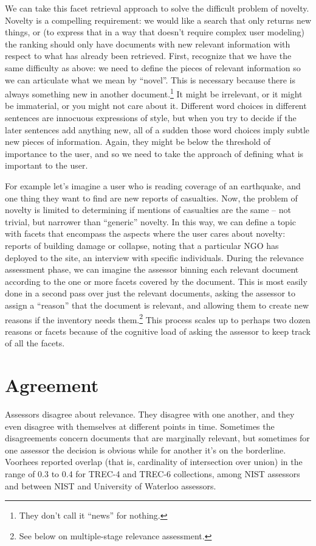 \documentclass[nobib]{tufte-book}
\begin{document}
We can take this facet retrieval approach to solve the difficult problem of novelty.  Novelty is a compelling requirement: we would like a search that only returns new things, or (to express that in a way that doesn't require complex user modeling) the ranking should only have documents with new relevant information with respect to what has already been retrieved.  First, recognize that we have the same difficulty as above: we need to define the pieces of relevant information so we can articulate what we mean by ``novel''.  This is necessary because there is always something new in another document.\footnote{They don't call it ``news'' for nothing.}  It might be irrelevant, or it might be immaterial, or you might not care about it.  Different word choices in different sentences are innocuous expressions of style, but when you try to decide if the later sentences add anything new, all of a sudden those word choices imply subtle new pieces of information.  Again, they might be below the threshold of importance to the user, and so we need to take the approach of defining what is important to the user.  

For example let's imagine a user who is reading coverage of an earthquake, and one thing they want to find are new reports of casualties.  Now, the problem of novelty is limited to determining if mentions of casualties are the same -- not trivial, but narrower than ``generic'' novelty.  In this way, we can define a topic with facets that encompass the aspects where the user cares about novelty: reports of building damage or collapse, noting that a particular NGO has deployed to the site, an interview with specific individuals.  During the relevance assessment phase, we can imagine the assessor binning each relevant document according to the one or more facets covered by the document.  This is most easily done in a second pass over just the relevant documents, asking the assessor to assign a ``reason'' that the document is relevant, and allowing them to create new reasons if the inventory needs them.\footnote{See below on multiple-stage relevance assessment.}  This process scales up to perhaps two dozen reasons or facets because of the cognitive load of asking the assessor to keep track of all the facets.

\section{Agreement}

Assessors disagree about relevance.  They disagree with one another, and they even disagree with themselves at different points in time.  Sometimes the disagreements concern documents that are marginally relevant, but sometimes for one assessor the decision is obvious while for another it's on the borderline. Voorhees reported overlap (that is, cardinality of intersection over union) in the range of 0.3 to 0.4 for TREC-4 and TREC-6 collections, among NIST assessors and between NIST and University of Waterloo assessors.\autocite{voorhees_variations_1998}
\end{document}
